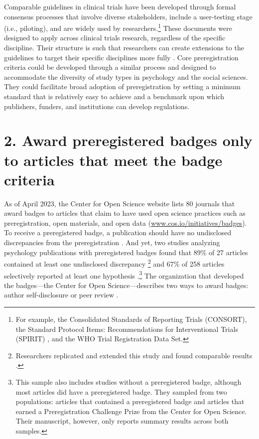 \documentclass[authordate, meta]{jote-new-article}
\begin{document}
Comparable guidelines in clinical trials have been developed through formal consensus processes that involve diverse stakeholders, include a user-testing stage (i.e., piloting), and are widely used by researchers.\footnote{For example, the Consolidated Standards of Reporting Trials (CONSORT), the Standard Protocol Items: Recommendations for Interventional Trials (SPIRIT) \parencites{Hopewell2022}, and the WHO Trial Registration Data Set.} These documents were designed to apply across clinical trials research, regardless of the specific discipline. Their structure is such that researchers can create extensions to the guidelines to target their specific disciplines more fully \parencites[e.g., traditional Chinese medicine:][]{Zhang2020}[pilot trials:][]{Thabane2016}. Core preregistration criteria could be developed through a similar process and designed to accommodate the diversity of study types in psychology and the social sciences. They could facilitate broad adoption of preregistration by setting a minimum standard that is relatively easy to achieve and a benchmark upon which publishers, funders, and institutions can develop regulations.







\section{2. Award preregistered badges only to articles that meet the badge criteria}



As of April 2023, the Center for Open Science website lists 80 journals that award badges to articles that claim to have used open science practices such as preregistration, open materials, and open data (\url{www.cos.io/initiatives/badges}). To receive a preregistered badge, a publication should have no undisclosed discrepancies from the preregistration \parencites{COS2019}. And yet, two studies analyzing psychology publications with preregistered badges found that 89\% of 27 articles contained at least one undisclosed discrepancy \parencites{Claesen2021}\footnote{ Researchers replicated and extended this study and found comparable results \parencites{Weaver2022}.} and 67\% of 258 articles selectively reported at least one hypothesis \parencites{vandenAkker2022}.\footnote{ This sample also includes studies without a preregistered badge, although most articles did have a preregistered badge. They sampled from two populations: articles that contained a preregistered badge and articles that earned a Preregistration Challenge Prize from the Center for Open Science. Their manuscript, however, only reports summary results across both samples.} The organization that developed the badges—the Center for Open Science—describes two ways to award badges: author self-disclosure or peer review \parencites{COS2016}.
\end{document}
